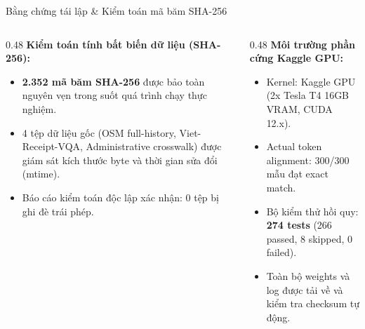\documentclass[aspectratio=169, 9pt]{beamer}
\begin{document}
\begin{frame}{Bằng chứng tái lập \& Kiểm toán mã băm SHA-256}
  \vspace{-0.15cm}
  \begin{columns}[T]
    \begin{column}{0.48\textwidth}
      \textbf{Kiểm toán tính bất biến dữ liệu (SHA-256):}
      \begin{itemize}
        \setlength{\itemsep}{2pt}
        \item \textbf{2.352 mã băm SHA-256} được bảo toàn nguyên vẹn trong suốt quá trình chạy thực nghiệm.
        \item 4 tệp dữ liệu gốc (OSM full-history, Viet-Receipt-VQA, Administrative crosswalk) được giám sát kích thước byte và thời gian sửa đổi (mtime).
        \item Báo cáo kiểm toán độc lập xác nhận: 0 tệp bị ghi đè trái phép.
      \end{itemize}
    \end{column}
    \begin{column}{0.48\textwidth}
      \textbf{Môi trường phần cứng Kaggle GPU:}
      \begin{itemize}
        \setlength{\itemsep}{2pt}
        \item Kernel: Kaggle GPU (2x Tesla T4 16GB VRAM, CUDA 12.x).
        \item Actual token alignment: 300/300 mẫu đạt exact match.
        \item Bộ kiểm thử hồi quy: \textbf{274 tests} (266 passed, 8 skipped, 0 failed).
        \item Toàn bộ weights và log được tải về và kiểm tra checksum tự động.
      \end{itemize}
    \end{column}
  \end{columns}
\end{frame}
\end{document}
